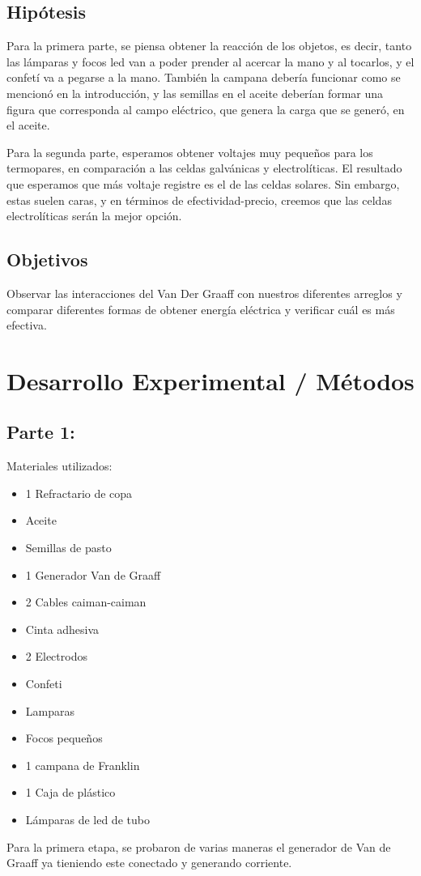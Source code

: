 \documentclass[article,12pt]{elsarticle}
\begin{document}
\subsection{Hipótesis}
Para la primera parte, se piensa obtener la reacción de los objetos, es decir, tanto las lámparas y focos led van a poder prender al acercar la mano y al tocarlos, y el confetí va a pegarse a la mano. También la campana debería funcionar como se mencionó en la introducción, y las semillas en el aceite deberían formar una figura que corresponda al campo eléctrico, que genera la carga que se generó, en el aceite.

Para la segunda parte, esperamos obtener voltajes muy pequeños para los termopares, en comparación a las celdas galvánicas y electrolíticas. El resultado que esperamos que más voltaje registre es el de las celdas solares. Sin embargo, estas suelen caras, y en términos de efectividad-precio, creemos que las celdas electrolíticas serán la mejor opción.
\subsection{Objetivos}
Observar las interacciones del Van Der Graaff con nuestros diferentes arreglos y comparar diferentes formas de obtener energía eléctrica y verificar cuál es más efectiva.
\section{Desarrollo Experimental / Métodos}
    \subsection{Parte 1:}
    Materiales utilizados:
    \begin{itemize}
        \item 1 Refractario de copa
        \item Aceite
        \item Semillas de pasto
        \item 1 Generador Van de Graaff
        \item 2 Cables caiman-caiman
        \item Cinta adhesiva
        \item 2 Electrodos
        \item Confeti
        \item Lamparas 
        \item Focos pequeños
        \item 1 campana de Franklin
        \item 1 Caja de plástico
        \item Lámparas de led de tubo
    \end{itemize}
    Para la primera etapa, se probaron de varias maneras el generador de Van de Graaff ya tieniendo este conectado y generando corriente.
\end{document}
